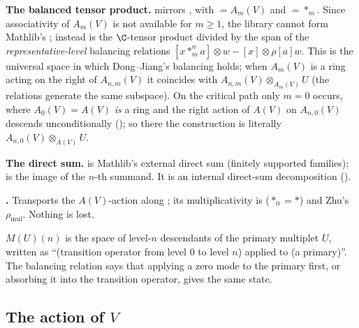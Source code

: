 \begin{dictionary}
\textbf{The balanced tensor product.}  mirrors , with  $= A_m(V)$ and
 $=*_m$. Since associativity of $A_m(V)$ is not available for $m\ge1$, the library cannot form Mathlib's
; instead  is the $\C$-tensor product divided by the span of the
\emph{representative-level} balancing relations $[x*^n_ma]\otimes w - [x]\otimes\rho[a]w$. This is the universal space in which
Dong--Jiang's balancing holds; when $A_m(V)$ is a ring acting on the right of $A_{n,m}(V)$ it coincides with
$A_{n,m}(V)\otimes_{A_m(V)}U$ (the relations generate the same subspace). On the critical path only $m = 0$ occurs, where
$A_0(V) = A(V)$ \emph{is} a ring and the right action of $A(V)$ on $A_{n,0}(V)$ descends unconditionally
(); so there the construction is literally $A_{n,0}(V)\otimes_{A(V)}U$.

\textbf{The direct sum.}  is Mathlib's external direct sum (finitely supported families);
 is the image of the $n$-th summand. It is an internal direct-sum decomposition
().

\textbf{.} Transports the $A(V)$-action along ; its
multiplicativity is  ($*_0 = *$) and Zhu's $\rho_{\mathrm{mul}}$. Nothing is lost.
\end{dictionary}

\begin{physics}
$M(U)(n)$ is the space of level-$n$ descendants of the primary multiplet $U$, written as ``(transition operator from level $0$
to level $n$) applied to (a primary)''. The balancing relation says that applying a zero mode to the primary first, or
absorbing it into the transition operator, gives the same state.
\end{physics}

\subsection{The action of \texorpdfstring{$V$}{V}}


